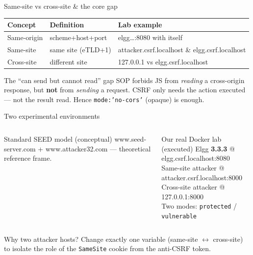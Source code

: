 \documentclass[11pt,aspectratio=169]{beamer}
\begin{document}
\begin{frame}{Same-site vs cross-site \& the core gap}
  \footnotesize
  \begin{tabular}{lll}
    \toprule
    \textbf{Concept} & \textbf{Definition} & \textbf{Lab example}\\
    \midrule
    Same-origin & scheme+host+port & elgg\ldots:8080 with itself\\
    Same-site & same site (eTLD+1) & attacker.csrf.localhost \& elgg.csrf.localhost\\
    Cross-site & different site & 127.0.0.1 vs elgg.csrf.localhost\\
    \bottomrule
  \end{tabular}
  \vfill
  \begin{alertblock}{The ``can send but cannot read'' gap}
    \footnotesize SOP forbids JS from \emph{reading} a cross-origin response, but \textbf{not} from \emph{sending} a request. CSRF only needs the action executed — not the result read. Hence \texttt{mode:'no-cors'} (opaque) is enough.
  \end{alertblock}
\end{frame}

\begin{frame}{Two experimental environments}
  \footnotesize
  \begin{columns}[t]
      \begin{block}{Standard SEED model (conceptual)}
        \scriptsize www.seed-server.com + www.attacker32.com — theoretical reference frame.
      \end{block}
      \begin{exampleblock}{Our real Docker lab (executed)}
        \scriptsize Elgg \textbf{3.3.3} @ elgg.csrf.localhost:8080\\
        Same-site attacker @ attacker.csrf.localhost:8000\\
        Cross-site attacker @ 127.0.0.1:8000\\
        Two modes: \texttt{protected} / \texttt{vulnerable}
      \end{exampleblock}
  \end{columns}
  \vfill
  \begin{block}{Why two attacker hosts?}
    \scriptsize Change \alert{exactly one variable} (same-site $\leftrightarrow$ cross-site) to isolate the role of the \texttt{SameSite} cookie from the anti-CSRF token.
  \end{block}
\end{frame}
\end{document}
